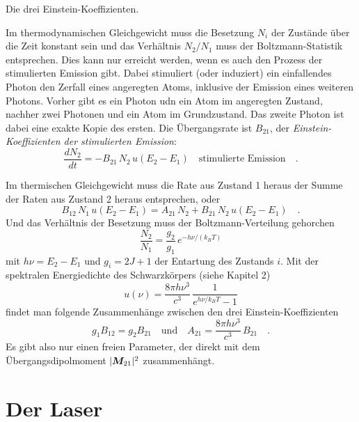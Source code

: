 \begin{marginfigure}
    \caption{Die drei Einstein-Koeffizienten.}
\end{marginfigure}

Im thermodynamischen Gleichgewicht muss die Besetzung $N_i$ der Zustände über die Zeit konstant sein und das Verhältnis $N_2 / N_1$ muss der Boltzmann-Statistik entsprechen. Dies kann nur erreicht werden, wenn es auch den  Prozess der stimulierten Emission gibt. Dabei stimuliert  (oder induziert) ein einfallendes Photon den Zerfall eines angeregten Atoms, inklusive der Emission eines weiteren Photons. Vorher gibt es ein Photon udn ein Atom im angeregten Zustand, nachher  zwei Photonen und ein Atom im Grundzustand. Das zweite Photon ist dabei eine exakte Kopie des ersten. Die Übergangsrate ist $B_{21}$, der  \emph{Einstein-Koeffizienten der stimulierten Emission}:
\begin{equation}
    \frac{d N_2}{dt} = - B_{21} \, N_2 \, u(E_2 - E_1)  \quad \text{stimulierte Emission}  \quad .\label{eq:7_k_stim}
\end{equation}


Im thermischen Gleichgewicht muss die Rate aus Zustand 1 heraus  der Summe der Raten aus Zustand 2 heraus entsprechen, 
oder 
\begin{equation}
    B_{12} \, N_1 \, u(E_2 - E_1) =   A_{21} \, N_2 + B_{21} \, N_2 \, u(E_2 - E_1)  \quad .
\end{equation}
Und das Verhältnis der Besetzung muss der Boltzmann-Verteilung gehorchen
\begin{equation}
    \frac{N_2}{N_1} = \frac{g_2}{g_1} \, e^{- h \nu / (k_B T)}
\end{equation}
mit $h \nu = E_2 - E_1$ und $g_i = 2J +1$ der Entartung des Zustands $i$. Mit der spektralen Energiedichte des Schwarzkörpers (siehe Kapitel 2)
\begin{equation}
    u(\nu) = \frac{8 \pi h \nu^3}{c^3} \,  \frac{1}{e^{h\nu/k_B T} -1}
\end{equation}
findet man folgende Zusammenhänge zwischen den drei Einstein-Koeffizienten
\begin{equation}
   g_1 B_{12}  = g_2 B_{21} \quad \text{und} \quad
   A_{21} = \frac{8 \pi h \nu^3}{c^3}\, B_{21}  \quad. 
\end{equation}
Es gibt also nur einen freien Parameter, der direkt mit dem Übergangsdipolmoment $|\boldsymbol{M}_{21}|^2$ zusammenhängt.


\section{Der Laser}

